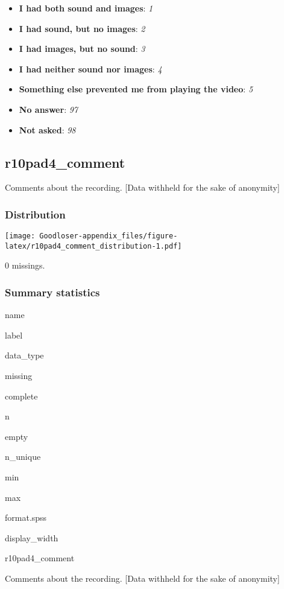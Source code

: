 \documentclass[]{book}
\providecommand{\tightlist}{%
  \setlength{\itemsep}{0pt}\setlength{\parskip}{0pt}}
\begin{document}
\begin{itemize}
\tightlist
\item
  \textbf{I had both sound and images}: \emph{1}
\item
  \textbf{I had sound, but no images}: \emph{2}
\item
  \textbf{I had images, but no sound}: \emph{3}
\item
  \textbf{I had neither sound nor images}: \emph{4}
\item
  \textbf{Something else prevented me from playing the video}: \emph{5}
\item
  \textbf{No answer}: \emph{97}
\item
  \textbf{Not asked}: \emph{98}
\end{itemize}

\subsection{r10pad4\_comment}\label{r10pad4_comment}

Comments about the recording. {[}Data withheld for the sake of
anonymity{]}

\subsubsection{Distribution}\label{r10pad4_comment_distribution}

\texttt{[image: Goodloser-appendix\_files/figure-latex/r10pad4\_comment\_distribution-1.pdf]}

0 missings.

\subsubsection{Summary statistics}\label{r10pad4_comment_summary}

name

label

data\_type

missing

complete

n

empty

n\_unique

min

max

format.spss

display\_width

r10pad4\_comment

Comments about the recording. {[}Data withheld for the sake of
anonymity{]}
\end{document}
